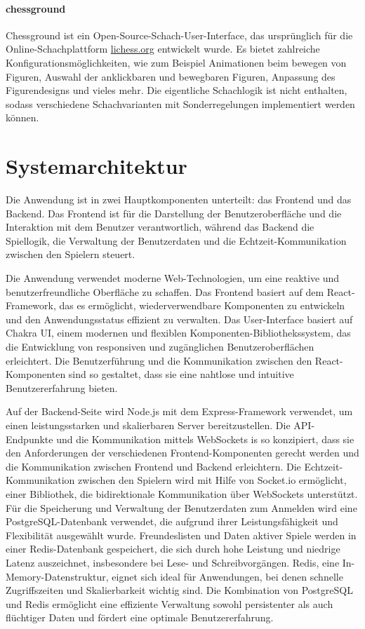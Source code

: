 \documentclass[a4paper,12pt]{report}
\newcommand{\footcite}[1]{\footnotemark\footnotetext{\cite{#1}}}
\begin{document}
        \subsubsection{chessground}
        \label{sec:chessground}
Chessground ist ein Open-Source-Schach-User-Interface, das ursprünglich für die Online-Schachplattform \url{lichess.org} entwickelt wurde\footcite{chessground}. Es bietet zahlreiche Konfigurationsmöglichkeiten, wie zum Beispiel Animationen beim bewegen von Figuren, Auswahl der anklickbaren und bewegbaren Figuren, Anpassung des Figurendesigns und vieles mehr. Die eigentliche Schachlogik ist nicht enthalten, sodass verschiedene Schachvarianten mit Sonderregelungen implementiert werden können.
        
        
\chapter{Systemarchitektur}
Die Anwendung ist in zwei Hauptkomponenten unterteilt: das Frontend und das Backend. Das Frontend ist für die Darstellung der Benutzeroberfläche und die Interaktion mit dem Benutzer verantwortlich, während das Backend die Spiellogik, die Verwaltung der Benutzerdaten und die Echtzeit-Kommunikation zwischen den Spielern steuert.

Die Anwendung verwendet moderne Web-Technologien, um eine reaktive und benutzerfreundliche Oberfläche zu schaffen. Das Frontend basiert auf dem React-Framework\footcite{react}, das es ermöglicht, wiederverwendbare Komponenten zu entwickeln und den Anwendungsstatus effizient zu verwalten. Das User-Interface basiert auf Chakra UI\footcite{chakraui}, einem modernen und flexiblen Komponenten-Bibliothekssystem, das die Entwicklung von responsiven und zugänglichen Benutzeroberflächen erleichtert. Die Benutzerführung und die Kommunikation zwischen den React-Komponenten sind so gestaltet, dass sie eine nahtlose und intuitive Benutzererfahrung bieten.

Auf der Backend-Seite wird Node.js\footcite{nodejs} mit dem Express-Framework verwendet, um einen leistungsstarken und skalierbaren Server bereitzustellen. Die API-Endpunkte und die Kommunikation mittels WebSockets is so konzipiert, dass sie den Anforderungen der verschiedenen Frontend-Komponenten gerecht werden und die Kommunikation zwischen Frontend und Backend erleichtern. Die Echtzeit-Kommunikation zwischen den Spielern wird mit Hilfe von Socket.io\footcite{socketio} ermöglicht, einer Bibliothek, die bidirektionale Kommunikation über WebSockets unterstützt. Für die Speicherung und Verwaltung der Benutzerdaten zum Anmelden wird eine PostgreSQL\footcite{postgresql}-Datenbank verwendet, die aufgrund ihrer Leistungsfähigkeit und Flexibilität ausgewählt wurde. Freundeslisten und Daten aktiver Spiele werden in einer Redis\footcite{redis}-Datenbank gespeichert, die sich durch hohe Leistung und niedrige Latenz auszeichnet, insbesondere bei Lese- und Schreibvorgängen. Redis, eine In-Memory-Datenstruktur, eignet sich ideal für Anwendungen, bei denen schnelle Zugriffszeiten und Skalierbarkeit wichtig sind. Die Kombination von PostgreSQL und Redis ermöglicht eine effiziente Verwaltung sowohl persistenter als auch flüchtiger Daten und fördert eine optimale Benutzererfahrung.
\end{document}
